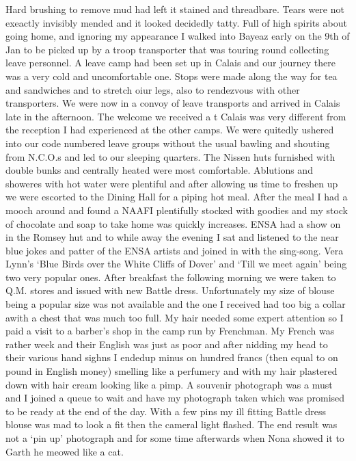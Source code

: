 Hard brushing to remove mud had left it stained and threadbare. Tears
were not exeactly invisibly mended and it looked decidedly tatty. Full
of high spirits about going home, and ignoring my appearance I walked
into Bayeaz early on the 9th of Jan to be picked up by a troop
transporter that was touring round collecting leave personnel. A leave
camp had been set up in Calais and our journey there was a very cold
and uncomfortable one. Stops were made along the way for tea and
sandwiches and to stretch oiur legs, also to rendezvous with other
transporters. We were now in a convoy of leave transports and
arrived in Calais late in the afternoon. The welcome we received a
t Calais was very different from the reception I had experienced at the
other camps. We were quitedly ushered into our code numbered leave
groups without the usual bawling and shouting from N.C.O.s and led to
our sleeping quarters. The Nissen huts furnished with double bunks and
centrally heated were most comfortable. Ablutions and showeres with
hot water were plentiful and after allowing us time to freshen up we
were escorted to the Dining Hall for a piping hot meal. After the meal
I had a mooch around and found a NAAFI plentifully stocked with
goodies and my stock of chocolate and soap to take home was quickly
increases. ENSA had a show on in the Romsey hut and to while away the
evening I sat and listened to the near blue jokes and patter of the
ENSA artists and joined in with the sing-song. Vera Lynn's `Blue Birds
over the White Cliffs of Dover' and `Till we meet again' being two
very popular ones. After breakfast the following morning we were taken
to Q.M. stores and issued with new Battle dress. Unfortunately my size
of blouse being a popular size was not available and the one I
received had too big a collar awith a chest that was much too full. My
hair needed some expert attention so I paid a visit to a barber's shop
in the camp run by Frenchman. My French was rather week and their
English was just as poor and after nidding my head to their various
hand sighns I endedup minus on hundred francs (then equal to on pound
in English money) smelling like a perfumery and with my hair plastered
down with hair cream looking like a pimp. A souvenir photograph was a
must and I joined a queue to wait and have my photograph taken which
was promised to be ready at the end of the day. With a few pins my ill
fitting Battle dress blouse was mad to look a fit then the cameral
light flashed. The end result was not a `pin up' photograph and for
some time afterwards when Nona showed it to Garth he meowed like a
cat.

